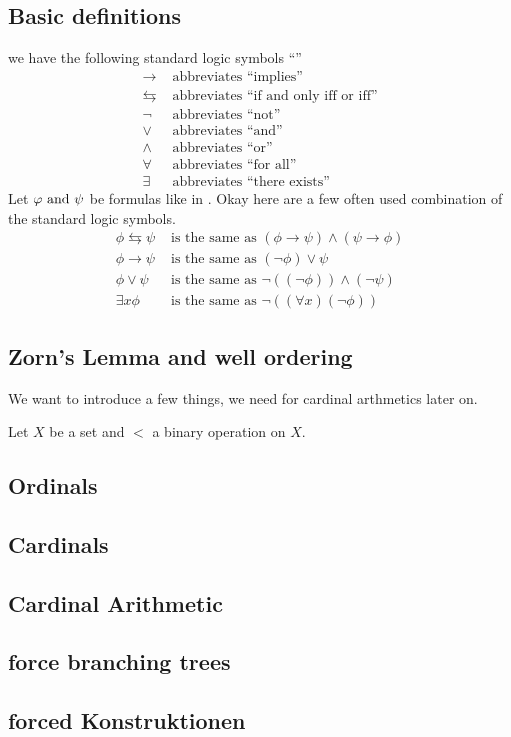 \subsection*{Basic definitions}
	we have the following standard logic symbols ``''
	\begin{align*}
		\rightarrow&\text{ abbreviates }\text{``implies''}\\
		\leftrightarrows&\text{ abbreviates }\text{``if and only iff or iff''}\\
		\neg&\text{ abbreviates }\text{``not''}\\
		\vee&\text{ abbreviates }\text{``and''}\\
		\wedge&\text{ abbreviates }\text{``or''}\\
		\forall&\text{ abbreviates }\text{``for all''}\\
		\exists&\text{ abbreviates }\text{``there exists''}
	\end{align*}
	Let $\varphi \text{ and } \psi$ be formulas like in . %
	Okay here are a few often used combination of the standard logic symbols. 
	\begin{align*}
		\phi \leftrightarrows \psi &\text{ is the same as } (\phi \to \psi) \wedge (\psi \to \phi)\\
		\phi \to \psi &\text{ is the same as } (\neg\phi) \vee \psi\\
		\phi \vee \psi&\text{ is the same as } \neg((\neg \phi)) \wedge (\neg \psi)\\
		\exists x \phi&\text{ is the same as } \neg ((\forall x)(\neg\phi))
	\end{align*}	
\subsection*{Zorn's Lemma and well ordering}
We want to introduce a few things, we need for cardinal arthmetics later on.
\begin{*definition}
	Let $X$ be a set and $<$ a binary operation on $X$.
\end{*definition}
\subsection*{Ordinals}
	
\subsection*{Cardinals}
	
\subsection*{Cardinal Arithmetic}

\subsection*{force branching trees}

\subsection*{forced Konstruktionen}